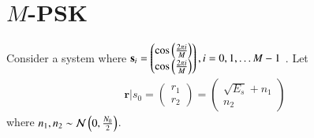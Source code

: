 \documentclass[journal,12pt,twocolumn]{IEEEtran}
\begin{document}
\section{$M$-PSK}
\begin{problem}
Consider a system where 
$\mathbf{s}_i=
\begin{pmatrix}
\cos\left(\frac{2\pi i}{M}\right)\\
\cos\left(\frac{2\pi i}{M}\right)
\end{pmatrix}, i = 0, 1 , \dots M-1
$
.
Let
%
\begin{align}
\mathbf{r}|s_0 = 
\begin{pmatrix}
r_1\\
r_2
\end{pmatrix}
=
\begin{pmatrix}
\sqrt{E_s}+n_1\\
n_2
\end{pmatrix}
\end{align}
where $n_1,n_2 \sim \mathcal{N}\left(0,\frac{N_0}{2}\right)$.


\end{problem}
\end{document}
